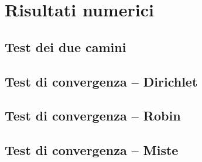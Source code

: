 \section{Risultati numerici}
\subsection{Test dei due camini}

\subsection{Test di convergenza -- Dirichlet}

\subsection{Test di convergenza -- Robin}

\subsection{Test di convergenza -- Miste}
